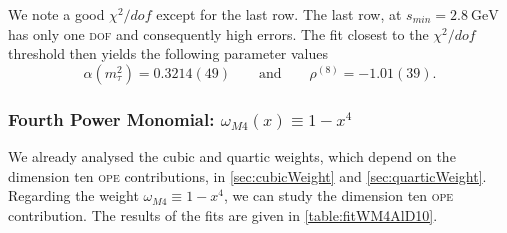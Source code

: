 \documentclass[../../index.tex]{subfiles}
\begin{document}
We note a good \(\chi^2/dof\) except for the last row. The last row, at
\(s_{min}=\SI{2.8}{\giga\eV}\) has only one \textsc{dof} and consequently high
errors. The fit closest to the \(\chi^2/dof\) threshold then yields the
following parameter values
\begin{equation}
  \alpha(m_\tau^2) = 0.3214(49) \qquad \text{and} \qquad \rho^{(8)}=-1.01(39).
\end{equation}


\subsubsection{Fourth Power Monomial: \(\omega_{M4}(x) \equiv 1-x^4\)}
We already analysed the cubic and quartic weights, which depend on the dimension
ten \textsc{ope} contributions, in \cref{sec:cubicWeight} and
\cref{sec:quarticWeight}. Regarding the weight \(\omega_{M4}\equiv 1-x^4\), we
can study the dimension ten \textsc{ope} contribution. The results of the fits
are given in \cref{table:fitWM4AlD10}.
\end{document}
